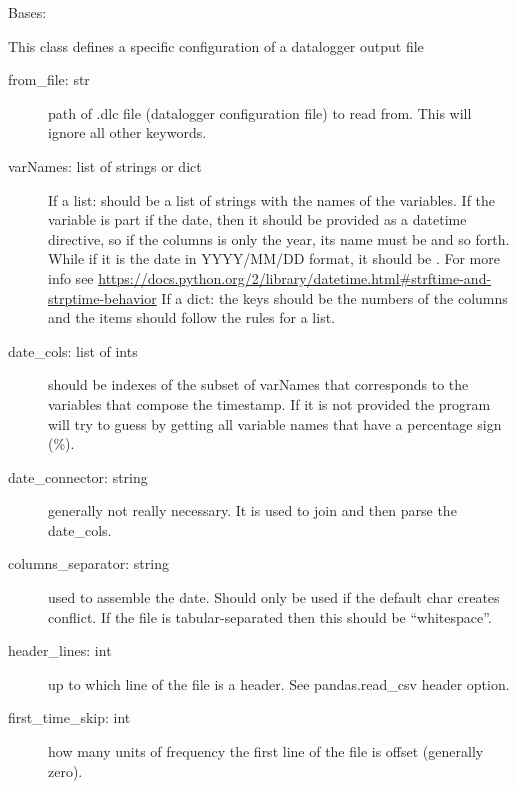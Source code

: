 \documentclass[a4paper,10pt,english]{sphinxmanual}
\begin{document}

\begin{fulllineitems}
\label{pymicra:pymicra.core.dataloggerConfig}
Bases: 

This class defines a specific configuration of a datalogger output file
\begin{description}
\item[{from\_file: str}] \leavevmode
path of .dlc file (datalogger configuration file) to read from. This will ignore all other
keywords.

\item[{varNames: list of strings or dict}] \leavevmode
If a list: should be a list of strings with the names of the variables. If the variable
is part if the date, then it should be provided as a datetime directive,
so if the columns is only the year, its name must be  and so forth. While
if it is the date in YYYY/MM/DD format, it should be . For more info
see \url{https://docs.python.org/2/library/datetime.html\#strftime-and-strptime-behavior}
If a dict: the keys should be the numbers of the columns and the items should follow
the rules for a list.

\item[{date\_cols: list of ints}] \leavevmode
should be indexes of the subset of varNames that corresponds to the variables that compose
the timestamp. If it is not provided the program will try to guess by getting
all variable names that have a percentage sign (\%).

\item[{date\_connector: string}] \leavevmode
generally not really necessary. It is used to join and then parse the date\_cols.

\item[{columns\_separator: string}] \leavevmode
used to assemble the date. Should only be used if the default char creates conflict. If
the file is tabular-separated then this should be ``whitespace''.

\item[{header\_lines: int}] \leavevmode
up to which line of the file is a header. See pandas.read\_csv header option.

\item[{first\_time\_skip: int}] \leavevmode
how many units of frequency the first line of the file is offset (generally zero).


\end{description}
\end{fulllineitems}
\end{document}
